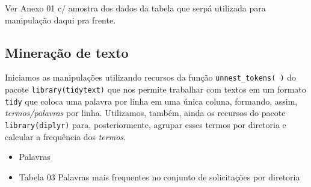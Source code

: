 \documentclass[]{article}
\newenvironment{Shaded}{\begin{snugshade}}{\end{snugshade}}
\newcommand{\KeywordTok}[1]{\textcolor[rgb]{0.13,0.29,0.53}{\textbf{#1}}}
\newcommand{\DataTypeTok}[1]{\textcolor[rgb]{0.13,0.29,0.53}{#1}}
\newcommand{\StringTok}[1]{\textcolor[rgb]{0.31,0.60,0.02}{#1}}
\newcommand{\CommentTok}[1]{\textcolor[rgb]{0.56,0.35,0.01}{\textit{#1}}}
\newcommand{\OtherTok}[1]{\textcolor[rgb]{0.56,0.35,0.01}{#1}}
\newcommand{\OperatorTok}[1]{\textcolor[rgb]{0.81,0.36,0.00}{\textbf{#1}}}
\newcommand{\NormalTok}[1]{#1}
\providecommand{\tightlist}{%
  \setlength{\itemsep}{0pt}\setlength{\parskip}{0pt}}
\begin{document}
\begin{Shaded}
\end{Shaded}

Ver Anexo 01 c/ amostra dos dados da tabela que serpá utilizada para
manipulação daqui pra frente.

\subsection{Mineração de texto}\label{mineracao-de-texto}

Iniciamos as manipulações utilizando recursos da função
\texttt{unnest\_tokens(\ )} do pacote \texttt{library(tidytext)} que nos
permite trabalhar com textos em um formato \texttt{tidy} que coloca uma
palavra por linha em uma única coluna, formando, assim,
\emph{termos/palavras} por linha. Utilizamos, também, ainda os recursos
do pacote \texttt{library(diplyr)} para, posteriormente, agrupar esses
termos por diretoria e calcular a frequência dos \emph{termos}.

\begin{itemize}
\tightlist
\item
  Palavras
\end{itemize}

\begin{Shaded}
\end{Shaded}

\begin{itemize}
\tightlist
\item
  Tabela 03 Palavras mais frequentes no conjunto de solicitações por
  diretoria
\end{itemize}
\end{document}
